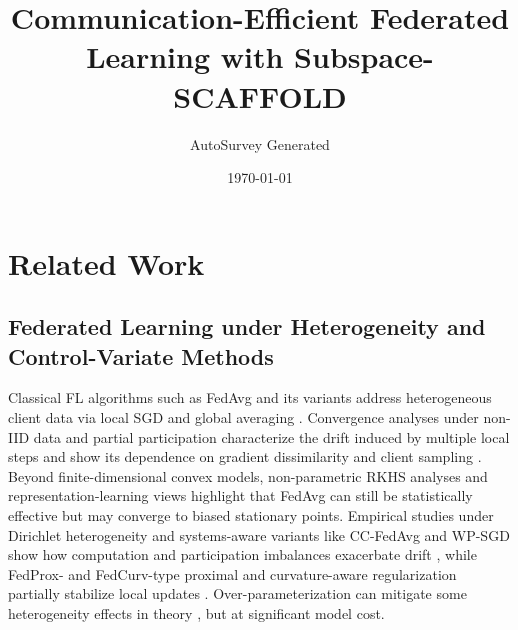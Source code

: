 \documentclass[11pt]{article}
\title{Communication-Efficient Federated Learning with Subspace-SCAFFOLD}
\author{AutoSurvey Generated}
\date{\today}
\begin{document}
\maketitle

\section{Related Work}

\subsection{Federated Learning under Heterogeneity and Control-Variate Methods}

Classical FL algorithms such as FedAvg and its variants address heterogeneous client data via local SGD and global averaging \citep{mcmahan2017communication}. Convergence analyses under non-IID data and partial participation characterize the drift induced by multiple local steps and show its dependence on gradient dissimilarity and client sampling \citep{li2019convergence, Yang2021AchievingLS, qu2023unified}. Beyond finite-dimensional convex models, non-parametric RKHS analyses \citep{su2023non} and representation-learning views \citep{collins2022fedavg} highlight that FedAvg can still be statistically effective but may converge to biased stationary points. Empirical studies under Dirichlet heterogeneity \citep{reguieg2023comparative} and systems-aware variants like CC-FedAvg and WP-SGD show how computation and participation imbalances exacerbate drift \citep{Zhang2022CCFedAvgCC, daning2017weighted}, while FedProx- and FedCurv-type proximal and curvature-aware regularization partially stabilize local updates \citep{yuan2020federated, shoham2019overcoming}. Over-parameterization can mitigate some heterogeneity effects in theory \citep{jian2025widening}, but at significant model cost.
\end{document}
